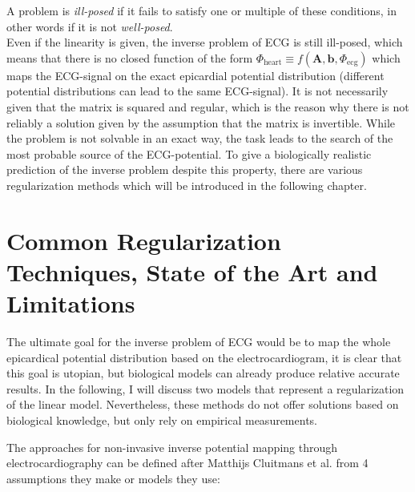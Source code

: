 A problem is \textit{ill-posed} if it fails to satisfy one or multiple of these conditions, in other words if it is not \textit{well-posed}.\\
Even if the linearity is given, the inverse problem of ECG is still ill-posed, which means that there is no closed function of the form $\varPhi_{\text{heart}}\equiv f(\textbf{A},\textbf{b},\varPhi_{\text{ecg}})$ which maps the ECG-signal on the exact epicardial potential distribution (different potential distributions can lead to the same ECG-signal). It is not necessarily given that the matrix is squared and regular, which is the reason why there is not reliably a solution given by the assumption that the matrix is invertible. While the problem is not solvable in an exact way, the task leads to the search of the most probable source of the ECG-potential. To give a biologically realistic prediction of the inverse problem despite this property, there are various regularization methods which will be introduced in the following chapter.\\


\section{Common Regularization Techniques, State of the Art and Limitations}
The ultimate goal for the inverse problem of ECG would be to map the whole epicardical potential distribution based on the electrocardiogram, it is clear that this goal is utopian, but biological models can already produce relative accurate results. 
In the following, I will discuss two models that represent a regularization of the linear model. Nevertheless, these methods do not offer solutions based on biological knowledge, but only rely on empirical measurements.

The approaches for non-invasive inverse potential mapping through electrocardiography can be defined after Matthijs Cluitmans et al. \cite{cluitmans_noninvasive_2015} from 4 assumptions they make or models they use:

